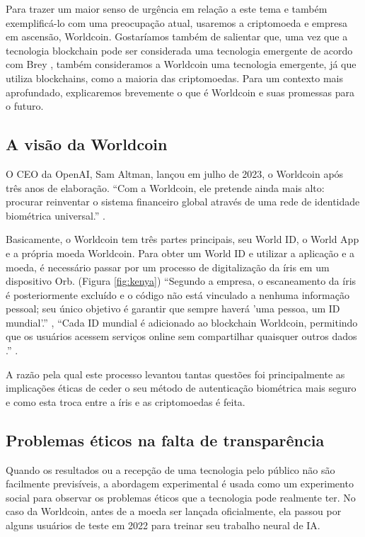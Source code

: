 \documentclass[referee,sn-basic]{sn-jnl}
\theoremstyle{thmstyleone}%
\begin{document}
Para trazer um maior senso de urgência em relação a este tema e também exemplificá-lo com uma preocupação atual, usaremos a criptomoeda e empresa em ascensão, Worldcoin. Gostaríamos também de salientar que, uma vez que a tecnologia blockchain pode ser considerada uma tecnologia emergente de acordo com Brey \cite{brey2017ethics}, também consideramos a Worldcoin uma tecnologia emergente, já que utiliza blockchains, como a maioria das criptomoedas. Para um contexto mais aprofundado, explicaremos brevemente o que é Worldcoin e suas promessas para o futuro.


\subsection{A visão da Worldcoin}
\hspace{0.7cm}O CEO da OpenAI, Sam Altman, lançou em julho de 2023, o Worldcoin após três anos de elaboração. “Com a Worldcoin, ele pretende ainda mais alto: procurar reinventar o sistema financeiro global através de uma rede de identidade biométrica universal.” \cite{roth2023worldcoin}.\par

Basicamente, o Worldcoin tem três partes principais, seu World ID, o World App e a própria moeda Worldcoin. Para obter um World ID e utilizar a aplicação e a moeda, é necessário passar por um processo de digitalização da íris em um dispositivo Orb. (Figura \ref{fig:kenya}) “Segundo a empresa, o escaneamento da íris é posteriormente excluído e o código não está vinculado a nenhuma informação pessoal; seu único objetivo é garantir que sempre haverá 'uma pessoa, um ID mundial'.” \cite{roth2023worldcoin}, “Cada ID mundial é adicionado ao blockchain Worldcoin, permitindo que os usuários acessem serviços online sem compartilhar quaisquer outros dados .” \cite{roth2023worldcoin}.\par

A razão pela qual este processo levantou tantas questões foi principalmente as implicações éticas de ceder o seu método de autenticação biométrica mais seguro e como esta troca entre a íris e as criptomoedas é feita.


\subsection{Problemas éticos na falta de transparência}

\hspace{0.7cm}Quando os resultados ou a recepção de uma tecnologia pelo público não são facilmente previsíveis, a abordagem experimental \cite{brey2017ethics} é usada como um experimento social para observar os problemas éticos que a tecnologia pode realmente ter. No caso da Worldcoin, antes de a moeda ser lançada oficialmente, ela passou por alguns usuários de teste em 2022 para treinar seu trabalho neural de IA.\par
\end{document}

